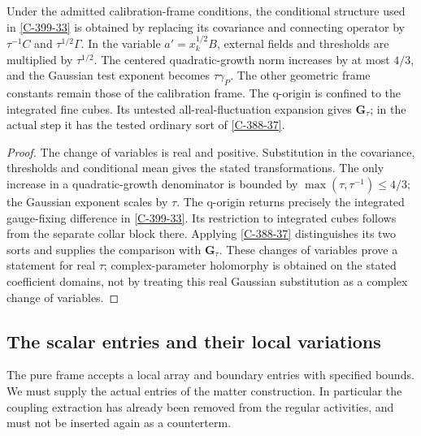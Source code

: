 \documentclass[11pt,letterpaper,reqno]{amsart}
\makeatletter
\theoremstyle{definition}
\newcommand{\ms@minorstart}{%
  \pushQED{\qed}\renewcommand{\qedsymbol}{$\blacksquare$}}
\newenvironment{lemma}[1][]{\ms@minorstart\ms@lemma[#1]}
  {\popQED\endms@lemma}
\theoremstyle{remark}
\makeatother
\begin{document}
\begin{lemma}[Bounds after real calibration]
\label{C-399-44}
Under the admitted calibration-frame conditions, the
conditional structure used in \cref{C-399-33} is obtained
by replacing its covariance and connecting operator by
$\tau^{-1}C$ and $\tau^{1/2}\Gamma$. In the variable
$a'=x_k^{1/2}B$, external fields and thresholds are
multiplied by $\tau^{1/2}$. The centered quadratic-growth
norm increases by at most $4/3$, and the Gaussian test
exponent becomes $\tau\gamma_P$. The other geometric
frame constants remain those of the calibration frame.
The q-origin is confined to the integrated fine cubes.
Its untested all-real-fluctuation expansion gives
$\mathbf G_\tau$; in the actual step it has the tested
ordinary sort of \cref{C-388-37}.
\end{lemma}
\begin{proof}
The change of variables is real and positive. Substitution
in the covariance, thresholds and conditional mean gives
the stated transformations. The only increase in a
quadratic-growth denominator is bounded by
$\max(\tau,\tau^{-1})\le4/3$; the Gaussian exponent scales
by $\tau$. The q-origin returns precisely the integrated
gauge-fixing difference in \cref{C-399-33}. Its restriction
to integrated cubes follows from the separate collar block
there. Applying \cref{C-388-37} distinguishes its two
sorts and supplies the comparison with $\mathbf G_\tau$.
These changes of variables prove a statement for real
$\tau$; complex-parameter holomorphy is obtained on the
stated coefficient domains, not by treating this real
Gaussian substitution as a complex change of variables.
\end{proof}

\subsection{The scalar entries and their local variations}

The pure frame accepts a local array and boundary entries
with specified bounds. We must supply the actual entries
of the matter construction. In particular the coupling
extraction has already been removed from the regular
activities, and must not be inserted again as a counterterm.
\end{document}
